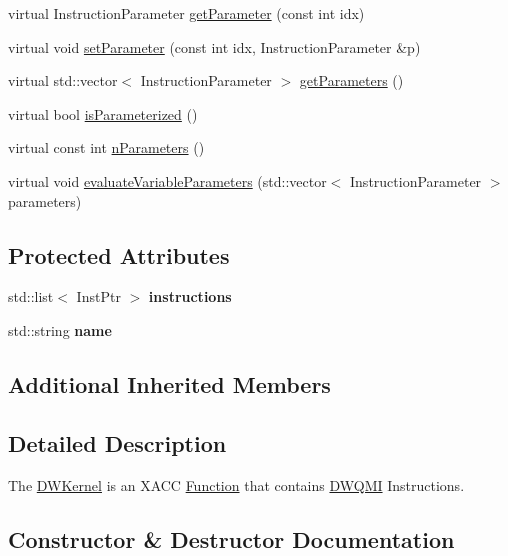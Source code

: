 \begin{DoxyCompactItemize}
\item 
virtual Instruction\+Parameter \hyperlink{a00045_a81711b7db284aba35d6952e4d1d15d41}{get\+Parameter} (const int idx)
\item 
virtual void \hyperlink{a00045_adf89cdd1f54e183c4cff36b338b2be8d}{set\+Parameter} (const int idx, Instruction\+Parameter \&p)
\item 
virtual std\+::vector$<$ Instruction\+Parameter $>$ \hyperlink{a00045_a829462cff34e2257da06afd8a2051a8e}{get\+Parameters} ()
\item 
virtual bool \hyperlink{a00045_a8957ea368244ed4a4ebd85f6bfecb785}{is\+Parameterized} ()
\item 
virtual const int \hyperlink{a00045_a029429948329b94c1d89f32cf5c486d4}{n\+Parameters} ()
\item 
virtual void \hyperlink{a00045_a09ffac417d4ecbbd82d7a680ad8dfcce}{evaluate\+Variable\+Parameters} (std\+::vector$<$ Instruction\+Parameter $>$ parameters)
\end{DoxyCompactItemize}
\subsection*{Protected Attributes}
\begin{DoxyCompactItemize}
\item 
std\+::list$<$ Inst\+Ptr $>$ {\bfseries instructions}\hypertarget{a00045_a38e434be6ef46a1ff43744632ae59ea8}{}\label{a00045_a38e434be6ef46a1ff43744632ae59ea8}

\item 
std\+::string {\bfseries name}\hypertarget{a00045_a0df03f85cc3b8a4cd1a7fc839d4d303c}{}\label{a00045_a0df03f85cc3b8a4cd1a7fc839d4d303c}

\end{DoxyCompactItemize}
\subsection*{Additional Inherited Members}


\subsection{Detailed Description}
The \hyperlink{a00045}{D\+W\+Kernel} is an X\+A\+CC \hyperlink{a00059}{Function} that contains \hyperlink{a00046}{D\+W\+Q\+MI} Instructions. 

\subsection{Constructor \& Destructor Documentation}
